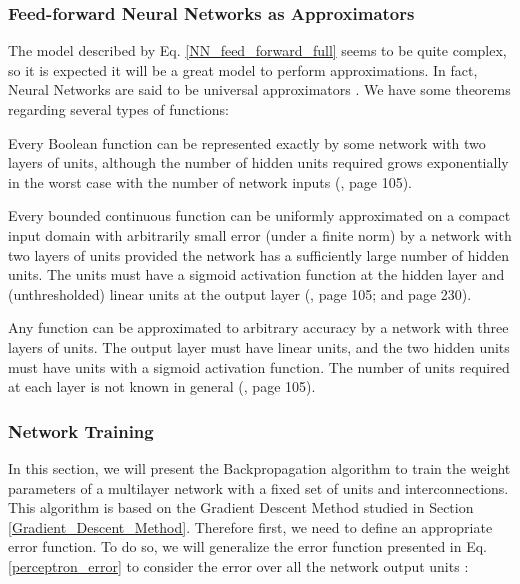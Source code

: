 \subsubsection{Feed-forward Neural Networks as Approximators}
\label{nn_power}
The model described by Eq. \ref{NN_feed_forward_full} seems to be quite complex, so it is expected it will be a great model to perform approximations. In fact, Neural Networks are said to be universal approximators \cite{machine_bishop}. We have some theorems regarding several types of functions:


\begin{theorem}
Every Boolean function can be represented exactly by some network with two layers of units, although the number of hidden units required grows exponentially in the worst case with the number of network inputs (\cite{machine_mitchell}, page 105).
\end{theorem}

\begin{theorem}
Every bounded continuous function can be uniformly approximated on a compact input domain with arbitrarily small error (under a finite norm) by a network with two layers of units provided the network has a sufficiently large number of hidden units. The units must have a sigmoid activation function at the hidden layer and (unthresholded) linear units at the output layer (\cite{machine_mitchell}, page 105; and \cite{machine_bishop} page 230).
\end{theorem}

\begin{theorem}
Any function can be approximated to arbitrary accuracy by a network with three layers of units. The output layer must have linear units, and the two hidden units must have units with a sigmoid activation function. The number of units required at each layer is not known in general (\cite{machine_mitchell}, page 105).
\end{theorem}

\subsubsection{Network Training}
\label{backpropagation}
In this section, we will present the Backpropagation algorithm to train the weight parameters of a multilayer network with a fixed set of units and interconnections. This algorithm is based on the Gradient Descent Method studied in Section \ref{Gradient_Descent_Method}. Therefore first, we need to define an appropriate error function. To do so, we will generalize the error function presented in Eq. \ref{perceptron_error} to consider the error over all the network output units \cite{machine_mitchell}: 

